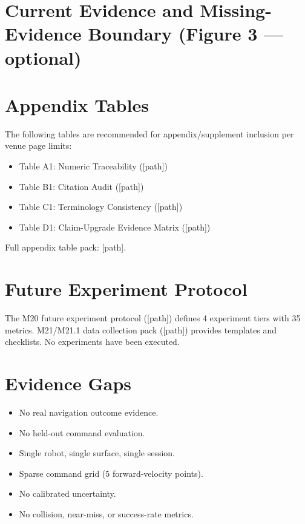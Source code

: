 ﻿%
\section{Current Evidence and Missing-Evidence Boundary (Figure 3 — optional)}

\section{Appendix Tables}
The following tables are recommended for appendix/supplement inclusion per venue page limits:
\begin{itemize}
\item Table A1: Numeric Traceability ([path])
\item Table B1: Citation Audit ([path])
\item Table C1: Terminology Consistency ([path])
\item Table D1: Claim-Upgrade Evidence Matrix ([path])
\end{itemize}
Full appendix table pack: [path].

\section{Future Experiment Protocol}
The M20 future experiment protocol ([path]) defines 4 experiment tiers with 35 metrics. M21/M21.1 data collection pack ([path]) provides templates and checklists. No experiments have been executed.

\section{Evidence Gaps}
\begin{itemize}
\item No real navigation outcome evidence.
\item No held-out command evaluation.
\item Single robot, single surface, single session.
\item Sparse command grid (5 forward-velocity points).
\item No calibrated uncertainty.
\item No collision, near-miss, or success-rate metrics.
\end{itemize}
